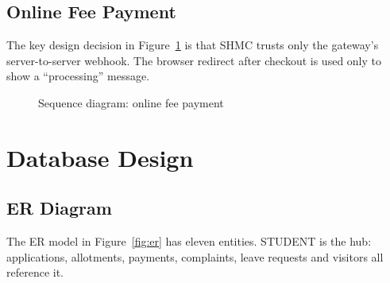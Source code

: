 \documentclass[11pt,a4paper]{report}
\begin{document}
\subsection{Online Fee Payment}
The key design decision in Figure~\ref{fig:seqpay} is that SHMC trusts only the gateway's server-to-server webhook. The browser redirect after checkout is used only to show a ``processing'' message.

\begin{figure}[!htbp]
\centering
{}
\caption{Sequence diagram: online fee payment}\label{fig:seqpay}
\end{figure}

\section{Database Design}
\subsection{ER Diagram}
The ER model in Figure~\ref{fig:er} has eleven entities. \textsf{STUDENT} is the hub: applications, allotments, payments, complaints, leave requests and visitors all reference it.
\end{document}

